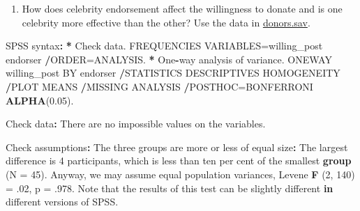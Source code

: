 \documentclass[a4paper]{book}
\newenvironment{Shaded}{\begin{snugshade}}{\end{snugshade}}
\newcommand{\KeywordTok}[1]{\textcolor[rgb]{0,0,0}{\textbf{#1}}}
\newcommand{\DataTypeTok}[1]{\textcolor[rgb]{0,0,0}{#1}}
\newcommand{\DecValTok}[1]{\textcolor[rgb]{0.00,0.00,0.00}{#1}}
\newcommand{\FloatTok}[1]{\textcolor[rgb]{0.00,0.00,0.00}{#1}}
\newcommand{\StringTok}[1]{\textcolor[rgb]{0.00,0.00,0.00}{#1}}
\newcommand{\ControlFlowTok}[1]{\textcolor[rgb]{0.00,0.00,0.00}{\textbf{#1}}}
\newcommand{\OperatorTok}[1]{\textcolor[rgb]{0.00,0.00,0.00}{\textbf{#1}}}
\newcommand{\ErrorTok}[1]{\textcolor[rgb]{0.00,0.00,0.00}{\textbf{#1}}}
\newcommand{\NormalTok}[1]{#1}
\providecommand{\tightlist}{%
  \setlength{\itemsep}{0pt}\setlength{\parskip}{0pt}}
\theoremstyle{definition}
\theoremstyle{definition}
\theoremstyle{definition}
\theoremstyle{remark}
\begin{document}
\begin{enumerate}
\def\labelenumi{\arabic{enumi}.}
\tightlist
\item
  How does celebrity endorsement affect the willingness to donate and is
  one celebrity more effective than the other? Use the data in
  \href{http://82.196.4.233:3838/data/donors.sav}{donors.sav}.
\end{enumerate}

\begin{Shaded}
\begin{Highlighting}[]
\NormalTok{SPSS syntax}\OperatorTok{:}\StringTok{  }
\StringTok{  }
\ErrorTok{*}\StringTok{ }\NormalTok{Check data.  }
\NormalTok{FREQUENCIES VARIABLES=willing_post endorser  }
  \OperatorTok{/}\NormalTok{ORDER=ANALYSIS.  }
\OperatorTok{*}\StringTok{ }\NormalTok{One}\OperatorTok{-}\NormalTok{way analysis of variance.  }
\NormalTok{ONEWAY willing_post BY endorser  }
  \OperatorTok{/}\NormalTok{STATISTICS DESCRIPTIVES HOMOGENEITY   }
  \OperatorTok{/}\NormalTok{PLOT MEANS  }
  \OperatorTok{/}\NormalTok{MISSING ANALYSIS  }
  \OperatorTok{/}\NormalTok{POSTHOC=BONFERRONI }\KeywordTok{ALPHA}\NormalTok{(}\FloatTok{0.05}\NormalTok{).  }
  
\NormalTok{Check data}\OperatorTok{:}\StringTok{  }
\StringTok{  }
\NormalTok{There are no impossible values on the variables.  }
  
\NormalTok{Check assumptions}\OperatorTok{:}\StringTok{  }
\StringTok{  }
\NormalTok{The three groups are more or less of equal size}\OperatorTok{:}\StringTok{ }\NormalTok{The largest difference is }\DecValTok{4}
\NormalTok{participants, which is less than ten per cent of the smallest }\KeywordTok{group}\NormalTok{ (}\DataTypeTok{N =} \DecValTok{45}\NormalTok{).}
\NormalTok{Anyway, we may assume equal population variances, Levene }\KeywordTok{F}\NormalTok{ (}\DecValTok{2}\NormalTok{, }\DecValTok{140}\NormalTok{) =}\StringTok{ }\NormalTok{.}\DecValTok{02}\NormalTok{, p =}
\NormalTok{.}\DecValTok{978}\NormalTok{. Note that the results of this test can be slightly different }\ControlFlowTok{in}
\NormalTok{different versions of SPSS.}
  

\end{Highlighting}
\end{Shaded}
\end{document}
